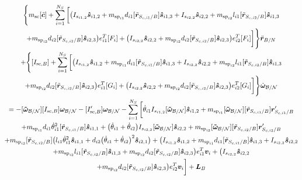 \documentclass[paper]{aiaaNew}
\begin{document}
	\begin{multline}
\Bigg \lbrace m_{\text{sc}} [\tilde{\bm{c}}] + \sum\limits_{i=1}^{N_S} \bigg[  \big(I_{s_{i1,2}}\bm{\hat{s}}_{i1,2}+m_{\text{sp}_{i1}}d_{i1} [\tilde{\bm{r}}_{S_{c,i1}/B}]   \bm{\hat{s}}_{i1,3} + I_{s_{i2,2}}\bm{\hat{s}}_{i2,2}
+m_{\text{sp}_{i2}}l_{i1} [\tilde{\bm{r}}_{S_{c,i2}/B}]  \bm{\hat{s}}_{i1,3}\\
+m_{\text{sp}_{i2}}d_{i2} [\tilde{\bm{r}}_{S_{c,i2}/B}] \bm{\hat{s}}_{i2,3}\big)e_{i1}^T[F_i]
 +\big( I_{s_{i2,2}}\bm{\hat{s}}_{i2,2}+m_{\text{sp}_{i2}} d_{i2} [\tilde{\bm{r}}_{S_{c,i2}/B}] \bm{\hat{s}}_{i2,3}\big)e_{i2}^T[F_i] \bigg]\Bigg \rbrace \ddot{\bm r}_{B/N}
\\+ \Bigg \lbrace [I_{\text{sc},B}] + \sum\limits_{i=1}^{N_S} \bigg[  \big(I_{s_{i1,2}}\bm{\hat{s}}_{i1,2}+m_{\text{sp}_{i1}}d_{i1} [\tilde{\bm{r}}_{S_{c,i1}/B}]   \bm{\hat{s}}_{i1,3} + I_{s_{i2,2}}\bm{\hat{s}}_{i2,2}
+m_{\text{sp}_{i2}}l_{i1} [\tilde{\bm{r}}_{S_{c,i2}/B}]  \bm{\hat{s}}_{i1,3}\\
+m_{\text{sp}_{i2}}d_{i2} [\tilde{\bm{r}}_{S_{c,i2}/B}] \bm{\hat{s}}_{i2,3}\big)e_{i1}^T[G_i] +\big( I_{s_{i2,2}}\bm{\hat{s}}_{i2,2}
+m_{\text{sp}_{i2}} d_{i2} [\tilde{\bm{r}}_{S_{c,i2}/B}] \bm{\hat{s}}_{i2,3}\big)e_{i2}^T[G_i] \bigg]\Bigg \rbrace \dot{\bm\omega}_{\cal B/N}
\\
= -[\bm{\tilde{\omega}}_{\cal B/N}] [I_{\text{sc},B}] \bm\omega_{\cal B/N} - [I'_{\text{sc},B}] \bm\omega_{\cal B/N} 
-  \sum\limits_{i=1}^{N_S} \bigg[
\dot{\theta}_{i1} I_{s_{i1,2}} [\bm{\tilde{\omega}}_{\cal B/N}] \bm{\hat{s}}_{i1,2} 
+m_{\text{sp}_{i1}} [\bm{\tilde{\omega}}_{\cal B/N}] [\tilde{\bm{r}}_{S_{c,i1}/B}] \bm{r}'_{S_{c,i1}/B} \\
+m_{\text{sp}_{i1}}d_{i1}\dot{\theta}_{i1}^2  [\tilde{\bm{r}}_{S_{c,i1}/B}] \bm{\hat{s}}_{i1,1}
+ \big(\dot{\theta}_{i1}+\dot{\theta}_{i2}\big) I_{s_{i2,2}}[\bm{\tilde{\omega}}_{\cal B/N}]\bm{\hat{s}}_{i2,2}
+m_{\text{sp}_{i2}} [\bm{\tilde{\omega}}_{\cal B/N}] [\tilde{\bm{r}}_{S_{c,i2}/B}] \bm{r}'_{S_{c,i2}/B} 	\\+m_{\text{sp}_{i2}} [\tilde{\bm{r}}_{S_{c,i2}/B}] \big(l_{i1} \dot{\theta}_{i1}^2 \bm{\hat{s}}_{i1,1} + d_{i2}\big(\dot{\theta}_{i1} + \dot{\theta}_{i2}\big)^2\bm{\hat{s}}_{i2,1}\big) +   \big(I_{s_{i1,2}}\bm{\hat{s}}_{i1,2}+m_{\text{sp}_{i1}}d_{i1} [\tilde{\bm{r}}_{S_{c,i1}/B}]   \bm{\hat{s}}_{i1,3} + I_{s_{i2,2}}\bm{\hat{s}}_{i2,2}\\
+m_{\text{sp}_{i2}}l_{i1} [\tilde{\bm{r}}_{S_{c,i2}/B}]  \bm{\hat{s}}_{i1,3}+m_{\text{sp}_{i2}}d_{i2} [\tilde{\bm{r}}_{S_{c,i2}/B}] \bm{\hat{s}}_{i2,3}\big)e_{i1}^T\bm v_i+\big( I_{s_{i2,2}}\bm{\hat{s}}_{i2,2}\\
+m_{\text{sp}_{i2}} d_{i2} [\tilde{\bm{r}}_{S_{c,i2}/B}] \bm{\hat{s}}_{i2,3}\big)e_{i2}^T\bm v_i\bigg]
+ \bm{L}_B 
\label{eq:Final8}
\end{multline}
\end{document}
